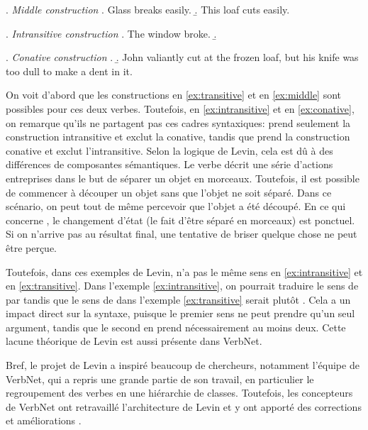 \ex. \label{ex:middle} \emph{Middle construction}
	\a. Glass breaks easily.
	\b. This loaf cuts easily.
	
\ex. \label{ex:intransitive} \emph{Intransitive construction}
	\a. The window broke.
	\b. 

\ex. \label{ex:conative} \emph{Conative construction}
	\a.
	\b. John valiantly cut at the frozen loaf, but his knife was too dull to make a dent in it.


On voit d'abord que les constructions en \ref{ex:transitive} et en \ref{ex:middle} sont possibles pour ces deux verbes. Toutefois, en \ref{ex:intransitive} et en \ref{ex:conative}, on remarque qu'ils ne partagent pas ces cadres syntaxiques:  prend seulement la construction intransitive et exclut la conative, tandis que  prend la construction conative et exclut l'intransitive. Selon la logique de Levin, cela est dû à des différences de composantes sémantiques. Le verbe  décrit une série d'actions entreprises dans le but de séparer un objet en morceaux. Toutefois, il est possible de commencer à découper un objet sans que l'objet ne soit séparé. Dans ce scénario, on peut tout de même percevoir que l'objet a été découpé. En ce qui concerne , le changement d'état (le fait d'être séparé en morceaux) est ponctuel. Si on n'arrive pas au résultat final, une tentative de briser quelque chose ne peut être perçue.

Toutefois, dans ces exemples de Levin,  n'a pas le même sens en \ref{ex:intransitive} et en \ref{ex:transitive}. Dans l'exemple \ref{ex:intransitive}, on pourrait traduire le sens de  par  tandis que le sens de  dans l'exemple \ref{ex:transitive} serait plutôt . Cela a un impact direct sur la syntaxe, puisque le premier sens ne peut prendre qu'un seul argument, tandis que le second en prend nécessairement au moins deux. Cette lacune théorique de Levin est aussi présente dans VerbNet.

Bref, le projet de Levin a inspiré beaucoup de chercheurs, notamment l'équipe de VerbNet, qui a repris une grande partie de son travail, en particulier le regroupement des verbes en une hiérarchie de classes. Toutefois, les concepteurs de VerbNet ont retravaillé l'architecture de Levin et y ont apporté des corrections et améliorations \citep{verbnet.2006}.


